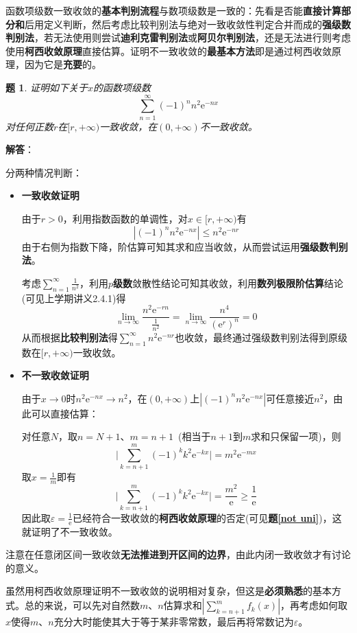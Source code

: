 \documentclass[a4paper,UTF8,fontset=windows,AutoFakeBold]{ctexart}
\newcommand*{\er}{\mathrm{e}}
\newcommand*{\suminf}[1][n=1]{\sum_{#1}^\infty}
\newcommand*{\note}{\noindent *}
\theoremstyle{ex}
\newtheorem{exercise}{题}
\newcommand{\exref}[1]{\textbf{题\;\ref{#1}\;}}
\newcommand{\sol}[1]{{\vspace{5pt}\kaishu\noindent\textbf{解答}：\vspace{-3pt}
\begin{compactitem}
    \item[] #1
\end{compactitem}
}}
\begin{document}
\note 函数项级数一致收敛的\textbf{基本判别流程}与数项级数是一致的：先看是否能\textbf{直接计算部分和}后用定义判断，然后考虑比较判别法与绝对一致收敛性判定合并而成的\textbf{强级数判别法}，若无法使用则尝试\textbf{迪利克雷判别法}或\textbf{阿贝尔判别法}，还是无法进行则考虑使用\textbf{柯西收敛原理}直接估算。证明不一致收敛的\textbf{最基本方法}即是通过柯西收敛原理，因为它是\textbf{充要}的。

\begin{framed}
\begin{exercise}
    证明如下关于$x$的函数项级数
    $$\sum_{n=1}^\infty(-1)^nn^2\er^{-nx}$$
    对任何正数$r$在$[r,+\infty)$一致收敛，在$(0,+\infty)$不一致收敛。
\end{exercise}
\sol{
    分两种情况判断：
    \begin{itemize}
        \item \textbf{一致收敛证明}
        
        由于$r>0$，利用指数函数的单调性，对$x\in[r,+\infty)$有
        $$|(-1)^nn^2\er^{-nx}|\le n^2\er^{-nr}$$
        由于右侧为指数下降，阶估算可知其求和应当收敛，从而尝试运用\textbf{强级数判别法}。

        考虑$\suminf\frac{1}{n^2}$，利用\textbf{$p$级数}敛散性结论可知其收敛，利用\textbf{数列极限阶估算}结论(可见上学期讲义2.4.1)得
        $$\lim_{n\to\infty}\frac{n^2\er^{-rn}}{\frac{1}{n^2}}=\lim_{n\to\infty}\frac{n^4}{(\er^r)^n}=0$$
        从而根据\textbf{比较判别法}得$\suminf n^2\er^{-nr}$也收敛，最终通过强级数判别法得到原级数在$[r,+\infty)$一致收敛。

        \item \textbf{不一致收敛证明}
        
        由于$x\to0$时$n^2\er^{-nx}\to n^2$，在$(0,+\infty)$上$|(-1)^nn^2\er^{-nx}|$可任意接近$n^2$，由此可以直接估算：

        对任意$N$，取$n=N+1$、$m=n+1$\ (相当于$n+1$到$m$求和只保留一项)，则
        $$\bigg|\sum_{k=n+1}^m(-1)^kk^2\er^{-kx}\bigg|=m^2\er^{-mx}$$
        取$x=\frac{1}{m}$即有
        $$\bigg|\sum_{k=n+1}^m(-1)^kk^2\er^{-kx}\bigg|=\frac{m^2}{\er}\ge\frac{1}{\er}$$
        因此取$\varepsilon=\frac{1}{\er}$已经符合一致收敛的\textbf{柯西收敛原理}的否定(可见\exref{not uni})，这就证明了不一致收敛。
    \end{itemize}
}
\end{framed}

\note 注意在任意闭区间一致收敛\textbf{无法推进到开区间的边界}，由此内闭一致收敛才有讨论的意义。

\note 虽然用柯西收敛原理证明不一致收敛的说明相对复杂，但这是\textbf{必须熟悉}的基本方式。总的来说，可以先对自然数$m$、$n$估算求和$|\sum_{k=n+1}^mf_k(x)|$，再考虑如何取$x$使得$m$、$n$充分大时能使其大于等于某非零常数，最后再将常数记为$\varepsilon$。
\end{document}
